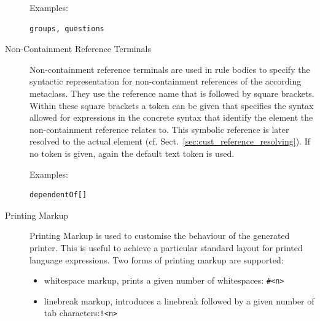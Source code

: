 \begin{description}
       Examples: \begin{verbatim}groups, questions\end{verbatim}

       \item[Non-Containment Reference Terminals] Non-containment reference
       terminals are used in rule bodies to specify the syntactic
       representation for non-containment references of the according metaclass.
       They use the reference name that is followed by square brackets.
       Within these square brackets a token can be given that specifies the syntax
       allowed for expressions in the concrete syntax that identify the element the
       non-containment reference relates to. This symbolic reference is later
       resolved to the actual element (cf.
       Sect.~\ref{sec:cust_reference_resolving}). If no token is given, again
       the default text token is used.

       Examples: \begin{verbatim}dependentOf[]\end{verbatim}
       
       \item[Printing Markup] Printing Markup is used to customise the behaviour
       of the generated printer. This is useful to achieve a particular standard
       layout for printed language expressions. Two forms of printing markup are
       supported: 
       \begin{itemize}
         \item whitespace markup, prints a given number of
         whitespaces: \texttt{\#<n>}
         \item linebreak markup, introduces a linebreak followed by a given 
         number of tab characters:\texttt{!<n>}
       \end{itemize}
    \end{description}

